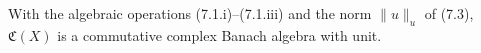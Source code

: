 With the algebraic operations (7.1.i)–(7.1.iii) and the norm $\|u\|_u$ of (7.3), $\mathfrak{C}(X)$ is a commutative complex Banach algebra with unit.